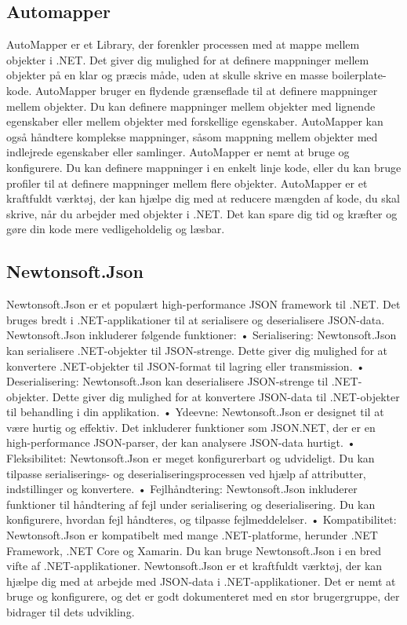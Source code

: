 \subsection{Automapper}
AutoMapper er et Library, der forenkler processen med at mappe mellem objekter i .NET. Det giver dig mulighed for at definere mappninger mellem objekter på en klar og præcis måde, uden at skulle skrive en masse boilerplate-kode.
AutoMapper bruger en flydende grænseflade til at definere mappninger mellem objekter. Du kan definere mappninger mellem objekter med lignende egenskaber eller mellem objekter med forskellige egenskaber.
AutoMapper kan også håndtere komplekse mappninger, såsom mappning mellem objekter med indlejrede egenskaber eller samlinger.
AutoMapper er nemt at bruge og konfigurere. Du kan definere mappninger i en enkelt linje kode, eller du kan bruge profiler til at definere mappninger mellem flere objekter.
AutoMapper er et kraftfuldt værktøj, der kan hjælpe dig med at reducere mængden af kode, du skal skrive, når du arbejder med objekter i .NET. Det kan spare dig tid og kræfter og gøre din kode mere vedligeholdelig og læsbar.

\subsection{Newtonsoft.Json}
Newtonsoft.Json er et populært high-performance JSON framework til .NET. Det bruges bredt i .NET-applikationer til at serialisere og deserialisere JSON-data.
Newtonsoft.Json inkluderer følgende funktioner:
•	Serialisering: Newtonsoft.Json kan serialisere .NET-objekter til JSON-strenge. Dette giver dig mulighed for at konvertere .NET-objekter til JSON-format til lagring eller transmission.
•	Deserialisering: Newtonsoft.Json kan deserialisere JSON-strenge til .NET-objekter. Dette giver dig mulighed for at konvertere JSON-data til .NET-objekter til behandling i din applikation.
•	Ydeevne: Newtonsoft.Json er designet til at være hurtig og effektiv. Det inkluderer funktioner som JSON.NET, der er en high-performance JSON-parser, der kan analysere JSON-data hurtigt.
•	Fleksibilitet: Newtonsoft.Json er meget konfigurerbart og udvideligt. Du kan tilpasse serialiserings- og deserialiseringsprocessen ved hjælp af attributter, indstillinger og konvertere.
•	Fejlhåndtering: Newtonsoft.Json inkluderer funktioner til håndtering af fejl under serialisering og deserialisering. Du kan konfigurere, hvordan fejl håndteres, og tilpasse fejlmeddelelser.
•	Kompatibilitet: Newtonsoft.Json er kompatibelt med mange .NET-platforme, herunder .NET Framework, .NET Core og Xamarin. Du kan bruge Newtonsoft.Json i en bred vifte af .NET-applikationer.
Newtonsoft.Json er et kraftfuldt værktøj, der kan hjælpe dig med at arbejde med JSON-data i .NET-applikationer. Det er nemt at bruge og konfigurere, og det er godt dokumenteret med en stor brugergruppe, der bidrager til dets udvikling.

